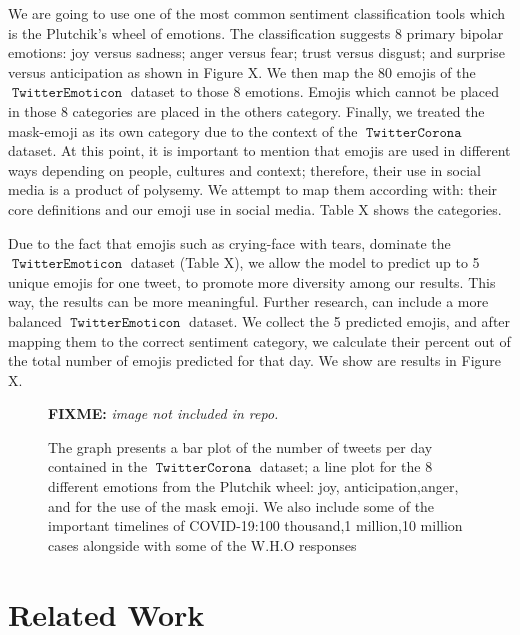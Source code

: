 \documentclass[11pt]{article}
\newcommand{\fixme}[1]{{\color{red} \textbf{FIXME:} {\textit {#1}}}}
\DeclareMathOperator{\emoticon}{\texttt{TwitterEmoticon}}
\DeclareMathOperator{\corona}{\texttt{TwitterCorona}}
\begin{document}
We are going to use one of the most common sentiment classification tools which is the Plutchik's wheel of emotions.
The classification \cite{} suggests 8 primary bipolar emotions: joy versus sadness; anger versus fear; trust versus disgust; 
and surprise versus anticipation as shown in Figure X. We then map the 80 emojis of the $\emoticon$ dataset
to those 8 emotions. Emojis which cannot be placed in those 8 categories are placed in the others category. 
Finally, we treated the mask-emoji as its own category due to the context of the $\corona$ dataset.
At this point, it is important to mention that emojis are used in different ways depending on people, cultures and context;
therefore, their use in social media is a product of polysemy. We attempt to map them according with: their core definitions and
our emoji use in social media. Table X shows the categories.  

Due to the fact that emojis such as crying-face with tears, dominate the $\emoticon$ dataset (Table X),
we allow the model to predict up to 5 unique emojis for one tweet, to promote more diversity among our results.
This way, the results can be more meaningful. Further research, can include a more balanced $\emoticon$ dataset.
We collect the 5 predicted emojis, and after mapping them to the correct sentiment category, we calculate their 
percent out of the total number of emojis predicted for that day.
We show are results in Figure X. 


\begin{figure}[ht]
    \centering
    \fixme{image not included in repo.}
    \caption{The graph presents a bar plot of the number of tweets per day contained in the $\corona$ dataset;
    a line plot for the 8 different emotions from the Plutchik wheel: joy, anticipation,anger, and for the use of the mask emoji.
    We also include some of the important timelines of COVID-19:100 thousand,1 million,10 million cases alongside with some of the W.H.O responses}
    \label{fig:tweets_per_day_sent}
\end{figure}


\section{Related Work}
\label{sec:related}
\end{document}

